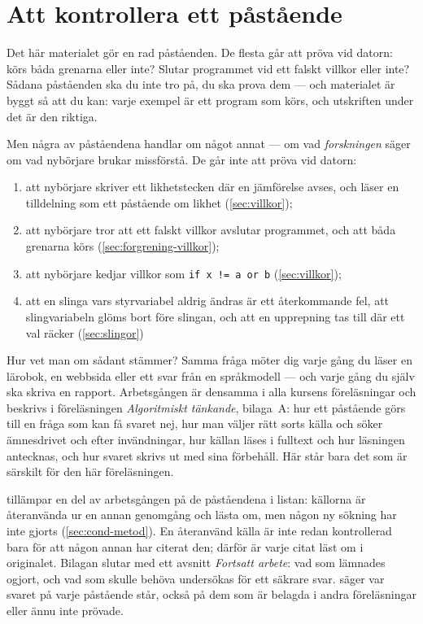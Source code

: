 \chapter{Att kontrollera ett påstående}
\label{app:verifiera-villkor}

Det här materialet gör en rad påståenden.  De flesta går att pröva vid
datorn: körs båda grenarna eller inte?  Slutar programmet vid ett falskt
villkor eller inte?  Sådana påståenden ska du inte tro på, du ska prova
dem --- och materialet är byggt så att du kan: varje exempel är ett
program som körs, och utskriften under det är den riktiga.

Men några av påståendena handlar om något annat --- om vad
\emph{forskningen} säger om vad nybörjare brukar missförstå.  De går inte
att pröva vid datorn:
\begin{enumerate}
  \item att nybörjare skriver ett likhetstecken där en jämförelse avses,
    och läser en tilldelning som ett påstående om likhet
    (\cref{sec:villkor});
  \item att nybörjare tror att ett falskt villkor avslutar programmet,
    och att båda grenarna körs (\cref{sec:forgrening-villkor});
  \item att nybörjare kedjar villkor som
    \texttt{if x != a or b} (\cref{sec:villkor});
  \item att en slinga vars styrvariabel aldrig ändras är ett
    återkommande fel, att slingvariabeln glöms bort före slingan, och att
    en upprepning tas till där ett val räcker (\cref{sec:slingor})%
\end{enumerate}
Hur vet man om sådant stämmer?  Samma fråga möter dig varje gång du läser
en lärobok, en webbsida eller ett svar från en språkmodell --- och varje
gång du själv ska skriva en rapport.  Arbetsgången är densamma i alla
kursens föreläsningar och beskrivs i föreläsningen \emph{Algoritmiskt
tänkande}, bilaga~A: hur ett påstående görs till en fråga som kan få
svaret nej, hur man väljer rätt sorts källa och söker ämnesdrivet och
efter invändningar, hur källan läses i fulltext och hur läsningen
antecknas, och hur svaret skrivs ut med sina förbehåll.  Här står bara
det som är särskilt för den här föreläsningen.

 tillämpar en del av arbetsgången på
de  påståendena i listan: källorna är
återanvända ur en annan genomgång och lästa om, men någon ny sökning har
inte gjorts (\cref{sec:cond-metod}).  En återanvänd källa är inte redan
kontrollerad bara för att någon annan har citerat den; därför är varje
citat läst om i originalet.  Bilagan slutar med ett avsnitt
\emph{Fortsatt arbete}: vad som lämnades ogjort, och vad som skulle
behöva undersökas för ett säkrare svar.  
säger var svaret på varje påstående står, också på dem som är belagda i
andra föreläsningar eller ännu inte prövade.

